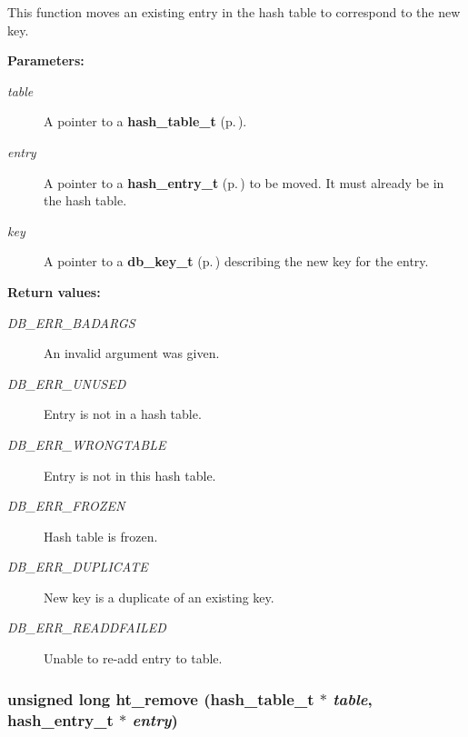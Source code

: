  This function moves an existing entry in the hash table to correspond to the new key.\begin{Desc}
\item[{\bf Parameters: }]\par
\begin{description}
\item[
{\em table}]A pointer to a {\bf hash\_\-table\_\-t} {\rm (p.\,\pageref{group__dbprim__hash_a0})}. \item[
{\em entry}]A pointer to a {\bf hash\_\-entry\_\-t} {\rm (p.\,\pageref{group__dbprim__hash_a1})} to be moved. It must already be in the hash table. \item[
{\em key}]A pointer to a {\bf db\_\-key\_\-t} {\rm (p.\,\pageref{group__dbprim__key_a0})} describing the new key for the entry.\end{description}
\end{Desc}
\begin{Desc}
\item[{\bf Return values: }]\par
\begin{description}
\item[
{\em DB\_\-ERR\_\-BADARGS}]An invalid argument was given. \item[
{\em DB\_\-ERR\_\-UNUSED}]Entry is not in a hash table. \item[
{\em DB\_\-ERR\_\-WRONGTABLE}]Entry is not in this hash table. \item[
{\em DB\_\-ERR\_\-FROZEN}]Hash table is frozen. \item[
{\em DB\_\-ERR\_\-DUPLICATE}]New key is a duplicate of an existing key. \item[
{\em DB\_\-ERR\_\-READDFAILED}]Unable to re-add entry to table. \end{description}
\end{Desc}
\subsubsection{\setlength{\rightskip}{0pt plus 5cm}unsigned long ht\_\-remove ({\bf hash\_\-table\_\-t} $\ast$ {\em table}, {\bf hash\_\-entry\_\-t} $\ast$ {\em entry})}\label{group__dbprim__hash_a9}




